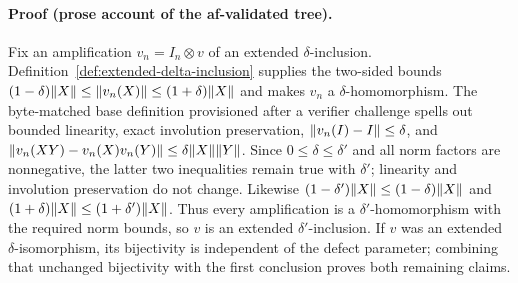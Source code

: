 \paragraph{Proof (prose account of the af-validated tree).}
Fix an amplification $v_n=I_n\otimes v$ of an extended $\delta$-inclusion.
Definition~\ref{def:extended-delta-inclusion} supplies the two-sided bounds
$(1-\delta)\lVert X\rVert\le\lVert v_n(X)\rVert\le(1+\delta)\lVert X\rVert$ and makes $v_n$
a $\delta$-homomorphism.  The byte-matched base definition provisioned after a
verifier challenge spells out bounded linearity, exact involution preservation,
$\lVert v_n(I)-I\rVert\le\delta$, and
$\lVert v_n(XY)-v_n(X)v_n(Y)\rVert\le\delta\lVert X\rVert\lVert Y\rVert$.
Since $0\le\delta\le\delta'$ and all norm factors are nonnegative, the latter
two inequalities remain true with $\delta'$; linearity and involution preservation
do not change.  Likewise
$(1-\delta')\lVert X\rVert\le(1-\delta)\lVert X\rVert$ and
$(1+\delta)\lVert X\rVert\le(1+\delta')\lVert X\rVert$.
Thus every amplification is a $\delta'$-homomorphism with the required norm bounds,
so $v$ is an extended $\delta'$-inclusion.  If $v$ was an extended
$\delta$-isomorphism, its bijectivity is independent of the defect parameter;
combining that unchanged bijectivity with the first conclusion proves both remaining claims.
